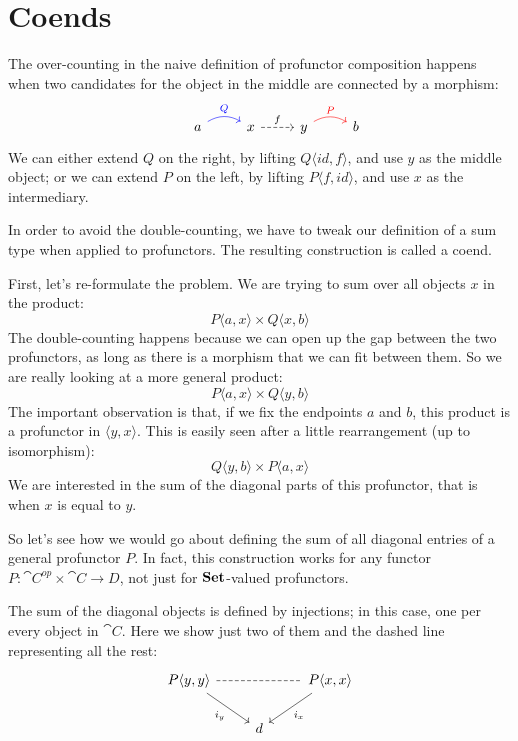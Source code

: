 \documentclass[DaoFP]{subfiles}
\begin{document}
\section{Coends}

The over-counting in the naive definition of profunctor composition happens when two candidates for the object in the middle are connected by a morphism:
\[
 \begin{tikzcd}
  & a
  \arrow[r, bend left, blue, "Q"]
  &x
  \arrow[r, dashed, "f"]
 & y
  \arrow[r, bend left, red, "P"]
 & b
  \end{tikzcd}
\]
We can either extend $Q$ on the right, by lifting $Q \langle id, f \rangle$, and use $y$ as the middle object; or we can extend $P$ on the left, by lifting $P \langle f, id \rangle$, and use $x$ as the intermediary.

In order to avoid the double-counting, we have to tweak our definition of a sum type when applied to profunctors. The resulting construction is called a coend. 

First, let's re-formulate the problem. We are trying to sum over all objects $x$ in the product:
\[ P \langle a, x \rangle \times Q \langle x, b \rangle \]
The double-counting happens because we can open up the gap between the two profunctors, as long as there is a morphism that we can fit between them. So we are really looking at a more general product:
\[ P \langle a, x \rangle \times Q \langle y, b \rangle \]
The important observation is that, if we fix the endpoints $a$ and $b$, this product is a profunctor in $\langle y, x \rangle$. This is easily seen after a little rearrangement (up to isomorphism):
\[ Q \langle y, b \rangle \times P \langle a, x \rangle \]
We are interested in the sum of the diagonal parts of this profunctor, that is when $x$ is equal to $y$. 

So let's see how we would go about defining the sum of all diagonal entries of a general profunctor $P$. In fact, this construction works for any functor $P \colon \cat C^{op} \times \cat C \to D$, not just for $\mathbf{Set}$-valued profunctors. 

The sum of the diagonal objects is defined by injections; in this case, one per every object in $\cat C$. Here we show just two of them and the dashed line representing all the rest:
\[
 \begin{tikzcd}
 P \langle y, y \rangle
 \arrow[dr, "i_y"']
 \arrow[rr, dash, dashed]
 &&P \langle x, x \rangle
 \arrow[dl, "i_x"]
 \\
 & d
 \end{tikzcd}
\]
\end{document}
